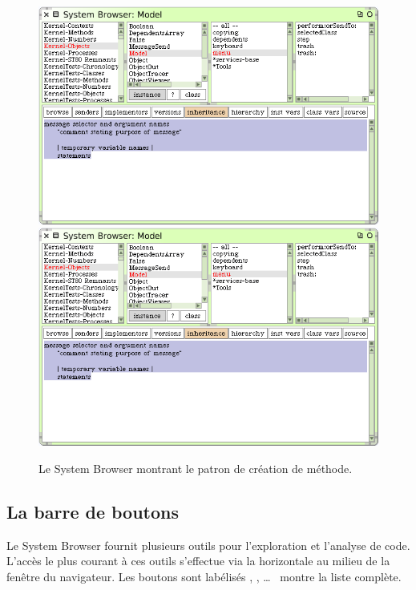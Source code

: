 \documentclass[a4paper,10pt,twoside]{book}
\begin{document}
\begin{figure}[htbp]
   \centering
   \ifluluelse
	   {\includegraphics [width=\textwidth]{SystemBrowserMethodTemplate}}
	   {\includegraphics[scale=.7]{SystemBrowserMethodTemplate}}
   \caption{Le System Browser montrant le patron de cr\'eation de m\'ethode.
   \label{fig:SystemBrowserMethodTemplate}}
\end{figure}

\subsection{La barre de boutons}
\label{sec:ButtonBar}

Le System Browser fournit plusieurs outils pour l'exploration et 
l'analyse de code. 
L'acc\`es le plus courant \`a ces outils s'effectue via la 
 horizontale au milieu
de la fen\^etre du navigateur. Les boutons sont lab\'elis\'es 
, , \ldots{}\ %
 montre la liste compl\`ete.
\end{document}
